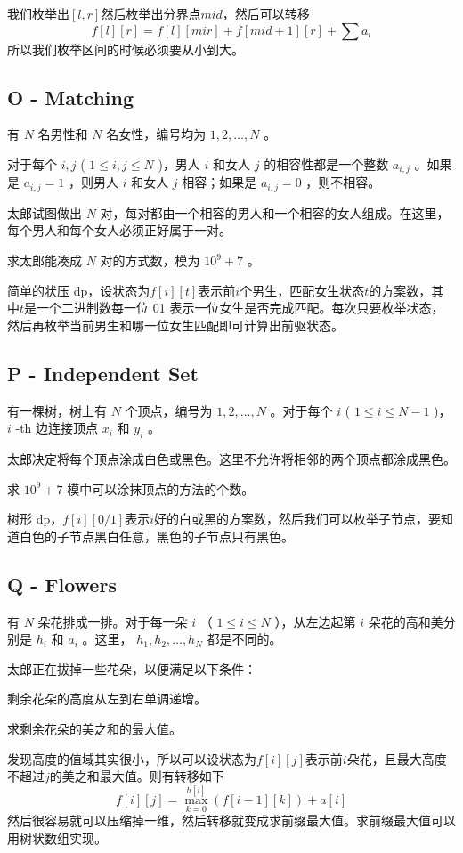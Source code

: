 我们枚举出$[l,r]$然后枚举出分界点$mid$，然后可以转移
$$
f[l][r]=f[l][mir] + f[mid+1][r] +\sum a_i
$$
所以我们枚举区间的时候必须要从小到大。


\subsection{O - Matching}
\begin{framed}
    有 $N$ 名男性和 $N$ 名女性，编号均为 $1, 2, \ldots, N$ 。

    对于每个 $i, j$ ( $1 \leq i, j \leq N$ )，男人 $i$ 和女人 $j$ 的相容性都是一个整数 $a _{i, j}$ 。如果是 $a_{i, j} = 1$ ，则男人 $i$ 和女人 $j$ 相容；如果是 $a _ {i, j} = 0$ ，则不相容。

    太郎试图做出 $N$ 对，每对都由一个相容的男人和一个相容的女人组成。在这里，每个男人和每个女人必须正好属于一对。

    求太郎能凑成 $N$ 对的方式数，模为 $10^9 + 7$ 。
\end{framed}
简单的状压 dp，设状态为$f[i][t]$表示前$i$个男生，匹配女生状态$t$的方案数，其中$t$是一个二进制数每一位 01 表示一位女生是否完成匹配。每次只要枚举状态，然后再枚举当前男生和哪一位女生匹配即可计算出前驱状态。


\subsection{P - Independent Set}
\begin{framed}
    有一棵树，树上有 $N$ 个顶点，编号为 $1, 2, \ldots, N$ 。对于每个 $i$ ( $1 \leq i \leq N - 1$ )， $i$ -th 边连接顶点 $x_i$ 和 $y_i$ 。

    太郎决定将每个顶点涂成白色或黑色。这里不允许将相邻的两个顶点都涂成黑色。

    求 $10^9 + 7$ 模中可以涂抹顶点的方法的个数。
\end{framed}
树形 dp，$f[i][0/1]$表示$i$好的白或黑的方案数，然后我们可以枚举子节点，要知道白色的子节点黑白任意，黑色的子节点只有黑色。


\subsection{Q - Flowers}
\begin{framed}
    有 $N$ 朵花排成一排。对于每一朵 $i$ （ $1 \leq i \leq N$ ），从左边起第 $i$ 朵花的高和美分别是 $h_i$ 和 $a_i$ 。这里， $h_1, h_2, \ldots, h_N$ 都是不同的。

    太郎正在拔掉一些花朵，以便满足以下条件：

    剩余花朵的高度从左到右单调递增。

    求剩余花朵的美之和的最大值。
\end{framed}
发现高度的值域其实很小，所以可以设状态为$f[i][j]$表示前$i$朵花，且最大高度不超过$j$的美之和最大值。则有转移如下
\[
    f[i][j] = \max_{k=0}^{h[i]}( f[i-1][k]) + a[i]
\]
然后很容易就可以压缩掉一维，然后转移就变成求前缀最大值。求前缀最大值可以用树状数组实现。


